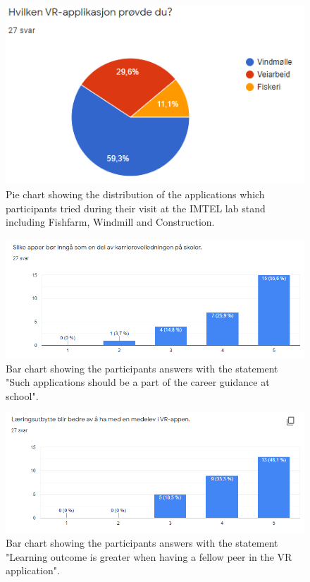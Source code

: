 \begin{figure}[!ht]
    \centering
    \captionsetup{width=.6\linewidth}
    \includegraphics[width=.6\textwidth]{./fig/phase_1/researcherNight/RN_Apps.PNG}
    \caption{Pie chart showing the distribution of the applications which participants tried during their visit at the IMTEL lab stand including Fishfarm, Windmill and Construction. }
    \label{fig:RN_Apps}
\end{figure}

\begin{figure}[!ht]
    \centering
    \captionsetup{width=.7\linewidth}
    \includegraphics[width=.8\textwidth]{./fig/phase_1/researcherNight/RN_careerguidenceSchool.PNG}
    \caption{Bar chart showing the participants answers with the statement "Such applications should be a part of the career guidance at school".}
    \label{fig:RN_careerguidenceSchool}
\end{figure}

\begin{figure}[!ht]
    \centering
    \captionsetup{width=.7\linewidth}
    \includegraphics[width=.8\textwidth]{./fig/phase_1/researcherNight/RN_VRpeer.PNG}
    \caption{Bar chart showing the participants answers with the statement "Learning outcome is greater when having a fellow peer in the VR application".}
    \label{fig:RN_VRpeer}
\end{figure}

